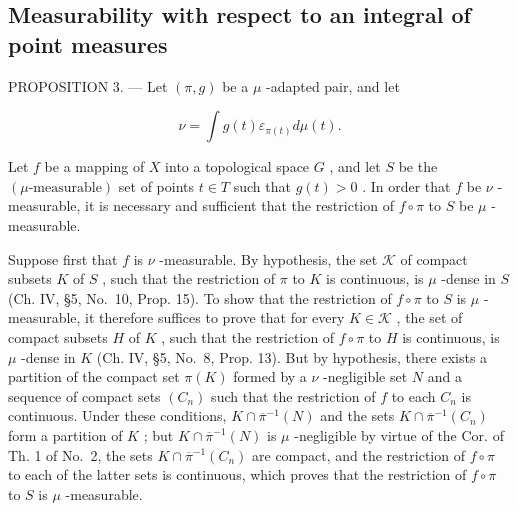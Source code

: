 \subsection{Measurability with respect to an integral of point measures}

PROPOSITION 3. --- Let \((\pi, g)\) be a \(\mu\) -adapted pair, and let

\[
\nu = \int g (t) \varepsilon_ {\pi (t)} d \mu (t).
\]

Let \(f\) be a mapping of \(X\) into a topological space \(G\) , and let \(S\) be the \((\mu\text{-measurable})\) set of points \(t \in T\) such that \(g(t) > 0\) . In order that \(f\) be \(\nu\) -measurable, it is necessary and sufficient that the restriction of \(f \circ \pi\) to \(S\) be \(\mu\) -measurable.

Suppose first that \(f\) is \(\nu\) -measurable. By hypothesis, the set \(\mathcal{K}\) of compact subsets \(K\) of \(S\) , such that the restriction of \(\pi\) to \(K\) is continuous, is \(\mu\) -dense in \(S\) (Ch. IV, §5, No.~10, Prop. 15). To show that the restriction of \(f \circ \pi\) to \(S\) is \(\mu\) -measurable, it therefore suffices to prove that for every \(K \in \mathcal{K}\) , the set of compact subsets \(H\) of \(K\) , such that the restriction of \(f \circ \pi\) to \(H\) is continuous, is \(\mu\) -dense in \(K\) (Ch. IV, §5, No.~8, Prop. 13). But by hypothesis, there exists a partition of the compact set \(\pi(K)\) formed by a \(\nu\) -negligible set \(N\) and a sequence of compact sets \((C_n)\) such that the restriction of \(f\) to each \(C_n\) is continuous. Under these conditions, \(K \cap \overline{\pi}^{-1}(N)\) and the sets \(K \cap \overline{\pi}^{-1}(C_n)\) form a partition of \(K\) ; but \(K \cap \overline{\pi}^{-1}(N)\) is \(\mu\) -negligible by virtue of the Cor. of Th. 1 of No.~2, the sets \(K \cap \overline{\pi}^{-1}(C_n)\) are compact, and the restriction of \(f \circ \pi\) to each of the latter sets is continuous, which proves that the restriction of \(f \circ \pi\) to \(S\) is \(\mu\) -measurable.

